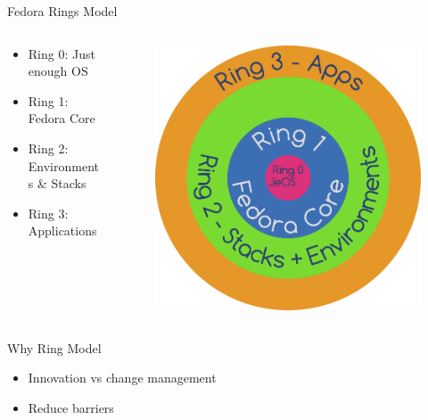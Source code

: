 \documentclass{beamer}
\begin{document}
\begin{frame}{Fedora Rings Model}
  \begin{columns}
    \begin{column}{.5\textwidth}
      \begin{itemize}
  \item Ring 0: Just enough OS
  \item Ring 1: Fedora Core
  \item Ring 2: Environments \& Stacks
  \item Ring 3: Applications
      \end{itemize}
    \end{column}
    \begin{column}{.5\textwidth}
      \begin{figure}[htbp]
        \centering
        \includegraphics[width=.8\textwidth]{fedora-next-ring.pdf}
      \end{figure}
    \end{column}
  \end{columns}
\end{frame}

\begin{frame}{Why Ring Model}
  \begin{itemize}
    \item Innovation vs change management
    \item Reduce barriers
  \end{itemize}
\end{frame}
\end{document}
